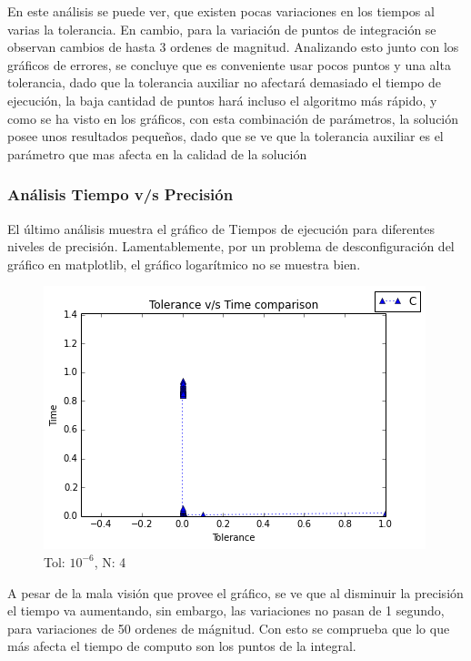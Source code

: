 \documentclass[fleqn]{article}
\begin{document}
En este análisis se puede ver, que existen pocas variaciones en los tiempos al varias la tolerancia. En cambio, para la variación de puntos de integración se observan cambios de hasta 3 ordenes de magnitud. Analizando esto junto con los gráficos de errores, se concluye que es conveniente usar pocos puntos y una alta tolerancia, dado que la tolerancia auxiliar no afectará demasiado el tiempo de ejecución, la baja cantidad de puntos hará incluso el algoritmo más rápido, y como se ha visto en los gráficos, con esta combinación de parámetros, la solución posee unos resultados pequeños, dado que se ve que la tolerancia auxiliar es el parámetro que mas afecta en la calidad de la solución

\subsubsection*{Análisis Tiempo v/s Precisión}
El último análisis muestra el gráfico de Tiempos de ejecución para diferentes niveles de precisión. Lamentablemente, por un problema de desconfiguración del gráfico en matplotlib, el gráfico logarítmico no se muestra bien. 


\begin{figure}[ht]
    \centering
    \includegraphics[scale=0.4]{images/p.png}
    \caption{Tol: $10^{-6}$, N: 4}
    \label{fig:23}
\end{figure}

A pesar de la mala visión que provee el gráfico, se ve que al disminuir la precisión el tiempo va aumentando, sin embargo, las variaciones no pasan de 1 segundo, para variaciones de 50 ordenes de mágnitud. Con esto se comprueba que lo que más afecta el tiempo de computo son los puntos de la integral.\newpage
\end{document}
